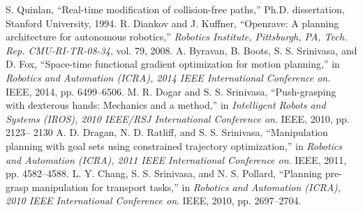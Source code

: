 \documentclass{IEEEtran}
\begin{document}
\begin{thebibliography}{99}
S. Quinlan, “Real-time modification of collision-free paths,” Ph.D.
dissertation, Stanford University, 1994.
R. Diankov and J. Kuffner, “Openrave: A planning architecture for
autonomous robotics,” \emph{Robotics Institute, Pittsburgh, PA, Tech. Rep.
CMU-RI-TR-08-34}, vol. 79, 2008.
A. Byravan, B. Boots, S. S. Srinivasa, and D. Fox, “Space-time
functional gradient optimization for motion planning,” in \emph{Robotics and
Automation (ICRA), 2014 IEEE International Conference on}. IEEE,
2014, pp. 6499–6506.
M. R. Dogar and S. S. Srinivasa, “Push-grasping with dexterous hands:
Mechanics and a method,” in \emph{Intelligent Robots and Systems (IROS),
2010 IEEE/RSJ International Conference on}. IEEE, 2010, pp. 2123–
2130
A. D. Dragan, N. D. Ratliff, and S. S. Srinivasa, “Manipulation
planning with goal sets using constrained trajectory optimization,” in
\emph{Robotics and Automation (ICRA), 2011 IEEE International Conference
on}. IEEE, 2011, pp. 4582–4588.
L. Y. Chang, S. S. Srinivasa, and N. S. Pollard, “Planning pre-grasp
manipulation for transport tasks,” in \emph{Robotics and Automation (ICRA),
2010 IEEE International Conference on}. IEEE, 2010, pp. 2697–2704.
\end{thebibliography}
\end{document}
